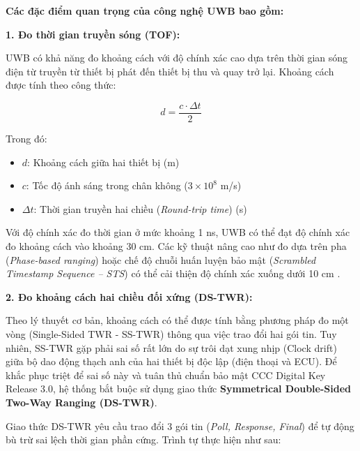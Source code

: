 \par\vspace{1em}
\textbf{Các đặc điểm quan trọng của công nghệ UWB bao gồm:}
\par\vspace{0.5em}
\textbf{1. Đo thời gian truyền sóng (TOF):}
\par\vspace{0.3em}
UWB có khả năng đo khoảng cách với độ chính xác cao dựa trên thời gian sóng điện từ truyền từ thiết bị phát đến thiết bị thu và quay trở lại. Khoảng cách được tính theo công thức:

\begin{equation}
d = \frac{c \cdot \Delta t}{2}
\end{equation}

Trong đó:
\begin{itemize}
    \item $d$: Khoảng cách giữa hai thiết bị (m)
    \item $c$: Tốc độ ánh sáng trong chân không ($3 \times 10^8$ m/s)
    \item $\Delta t$: Thời gian truyền hai chiều (\textit{Round-trip time}) (s)
\end{itemize}

Với độ chính xác đo thời gian ở mức khoảng 1 ns, UWB có thể đạt độ chính xác đo khoảng cách vào khoảng 30 cm. Các kỹ thuật nâng cao như đo dựa trên pha (\textit{Phase-based ranging}) hoặc chế độ chuỗi huấn luyện bảo mật (\textit{Scrambled Timestamp Sequence -- STS}) có thể cải thiện độ chính xác xuống dưới 10 cm \cite{decawave2017}.
\par\vspace{0.5em}
\textbf{2. Đo khoảng cách hai chiều đối xứng (DS-TWR):}
\par\vspace{0.3em}
Theo lý thuyết cơ bản, khoảng cách có thể được tính bằng phương pháp đo một vòng (Single-Sided TWR - SS-TWR) thông qua việc trao đổi hai gói tin. Tuy nhiên, SS-TWR gặp phải sai số rất lớn do sự trôi dạt xung nhịp (Clock drift) giữa bộ dao động thạch anh của hai thiết bị độc lập (điện thoại và ECU). Để khắc phục triệt để sai số này và tuân thủ chuẩn bảo mật CCC Digital Key Release 3.0, hệ thống bắt buộc sử dụng giao thức \textbf{Symmetrical Double-Sided Two-Way Ranging (DS-TWR)}.

Giao thức DS-TWR yêu cầu trao đổi 3 gói tin (\textit{Poll, Response, Final}) để tự động bù trừ sai lệch thời gian phần cứng. Trình tự thực hiện như sau:

